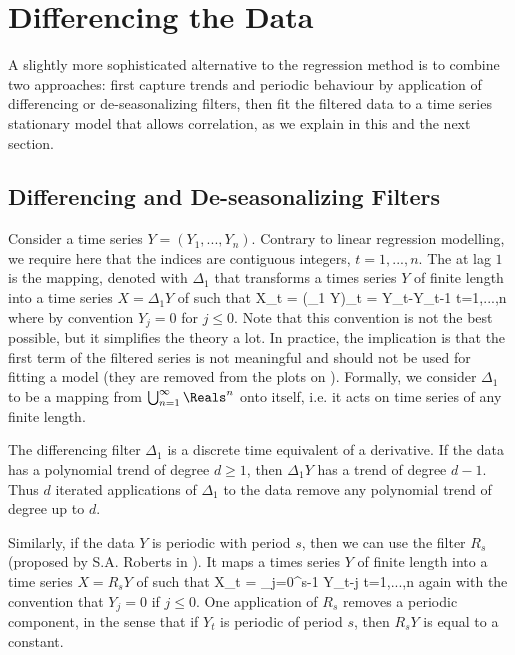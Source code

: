\section{Differencing the Data}
A slightly more sophisticated alternative to the regression method
is to combine two approaches: first capture trends and periodic
behaviour by application of differencing or de-seasonalizing
filters, then fit the filtered data to a time series stationary
model that allows correlation, as we explain in this and the next
section.

\subsection{Differencing and De-seasonalizing Filters}
 \label{forecast-preprocess}
Consider a time series $Y=(Y_1, ...,Y_n)$. Contrary to linear
regression modelling, we require here that the indices are
contiguous integers, $t=1,...,n$. The 
at lag $1$ is the mapping, denoted with $\Delta_1$ that
transforms a times series $Y$ of finite length into a time
series $X=\Delta_1 Y$ of  such that
 \be
 X_t = (\Delta_1 Y)_t = Y_{t}-Y_{t-1} \;\;\;\;\;
 t=1,...,n
 \ee
where by convention $Y_j=0$ for $j \leq 0$. Note that this
convention is not the best possible, but it simplifies the
theory a lot. In practice, the implication is that the first
term of the filtered series is not meaningful and should not be
used for fitting a model (they are removed from the plots on
). Formally, we consider $\Delta_1$ to be
a mapping from $\bigcup_{n =1}^{\infty} \Reals^n$ onto itself,
i.e. it acts on time series of any finite length.

The differencing filter $\Delta_1$ is a discrete time
equivalent of a derivative. If the data has a
polynomial trend of degree $d\geq 1$, then $\Delta_1
Y$ has a trend of degree $d-1$. Thus $d$ iterated
applications of $\Delta_1$ to the data remove any
polynomial trend of degree up to $d$.

Similarly, if the data $Y$ is periodic with period $s$, then we
can use the  filter $R_s$
(proposed by S.A. Roberts in \cite{roberts-82}). It maps a
times series $Y$ of finite length into a time series $X = R_s
Y$ of  such that
 \be
 X_t = \sum_{j=0}^{s-1} Y_{t-j} \;\;\;\;\;
 t=1,...,n
 \ee again with the convention that $Y_j=0$ if $j\leq
 0$. One application of $R_s$ removes a periodic
component, in the sense that if $Y_t$ is periodic of
period $s$, then $R_s Y$ is equal to a constant.

